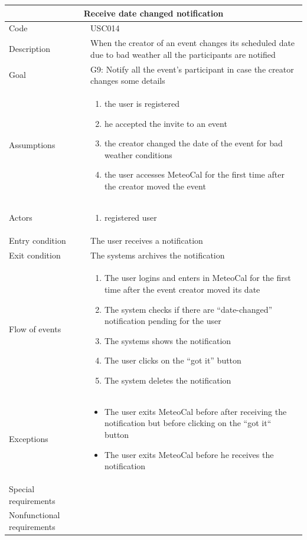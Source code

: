 \documentclass[10pt,a4paper,titlepage]{article}
\begin{document}
\begin{tabular}[h]{| p{3cm} | p{10cm} |} 
\hline \multicolumn{2}{|c|}{\textbf{Receive date changed notification}} \\  
\hline Code & USC014\\  
\hline Description & When the creator of an event changes its scheduled date due to bad weather all the participants are notified\\ 
\hline Goal & G9: Notify all the event's participant in case the creator changes some details\\ 
\hline Assumptions  & \begin{enumerate} 
\item the user is registered 
\item he accepted the invite to an event 
\item the creator changed the date of the event for bad weather conditions 
\item the user accesses MeteoCal for the  first time after the creator moved the event
\end{enumerate} \\ 
\hline Actors &  \begin{enumerate} 
\item registered user 
\end{enumerate} \\ 
\hline Entry condition & The user receives a notification\\ 
\hline Exit condition & The systems archives the notification\\ 
\hline Flow of events & \begin{enumerate} 
\item The user logins and enters in MeteoCal for the first time after the event creator moved its date
\item The system checks if there are “date-changed” notification pending for the user
\item The systems shows the notification
\item The user clicks on the “got it” button
\item The system deletes the notification
\end{enumerate}\\ 
\hline Exceptions & \begin{itemize}
\item The user exits MeteoCal before after receiving the notification but before clicking on the “got it“ button
\item The user exits MeteoCal before he receives the notification
\end{itemize}\\ 
\hline Special requirements & \\ 
\hline Nonfunctional requirements & \\
\hline 
\end{tabular} 
\end{document}
